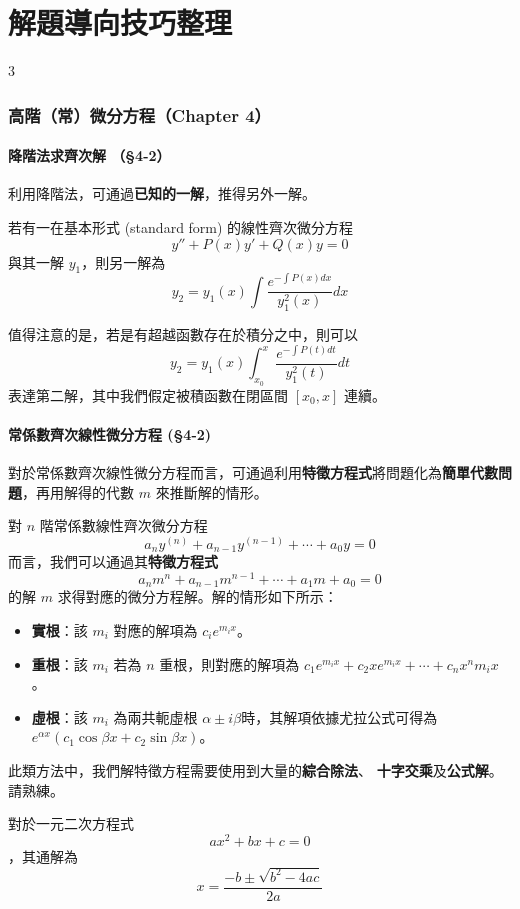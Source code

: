 \documentclass[UTF8, a4paper, fontset=none]{ctexart}
\begin{document}

\part{解題導向技巧整理}

\begin{multicols}{3}

\section{高階（常）微分方程（Chapter 4）} 	

\subsection{降階法求齊次解 （§4-2）}

利用降階法，可通過\textbf{已知的一解}，推得另外一解。

\begin{tcolorbox}[size=small, title={\textbf{降階法}（已知一齊次解，待求另一解。）}]
若有一在基本形式 (standard form) 的線性齊次微分方程
$$
y''+P(x)y'+Q(x)y=0
$$
與其一解 $y_1$，則另一解為
$$
y_2 = y_1(x) \int {\frac{e^{-\int{P(x)dx}}}{y_1^2(x)} dx}
$$
\end{tcolorbox}

值得注意的是，若是有超越函數存在於積分之中，則可以
$$
y_2 = y_1(x) \int_{x_0}^{x} {\frac{e^{-\int{P(t)dt}}}{y_1^2(t)} dt}
$$
表達第二解，其中我們假定被積函數在閉區間 $[x_0, x]$ 連續。

\subsection{常係數齊次線性微分方程 (§4-2)}
對於常係數齊次線性微分方程而言，可通過利用\textbf{特徵方程式}將問題化為\textbf{簡單代數問題}，再用解得的代數 $m$ 來推斷解的情形。
\begin{tcolorbox}[size=small, title={\textbf{特徵方程式} (auxiliary equation) }]
對 $n$ 階常係數線性齊次微分方程
$$
a_ny^{(n)}+a_{n-1}y^{(n-1)}+\cdots+a_0y=0
$$
而言，我們可以通過其\textbf{特徵方程式}
$$
a_nm^n+a_{n-1}m^{n-1}+\cdots+a_1m+a_0=0
$$
的解 $m$ 求得對應的微分方程解。解的情形如下所示：
\begin{itemize}
\item \textbf{實根}：該 $m_i$ 對應的解項為 $c_ie^{m_ix}$。
\item \textbf{重根}：該 $m_i$ 若為 $n$ 重根，則對應的解項為 $c_1e^{m_ix}+c_2xe^{m_ix}+\cdots+c_nx^n{m_ix}$。
\item \textbf{虛根}：該 $m_i$ 為兩共軛虛根 $\alpha\pm i\beta$時，其解項依據尤拉公式可得為 $e^{\alpha x} (c_1 \cos{\beta x}+c_2 \sin{\beta x})$。
\end{itemize}
\end{tcolorbox}
此類方法中，我們解特徵方程需要使用到大量的\textbf{綜合除法}、 \textbf{十字交乘}及\textbf{公式解}。請熟練。
\begin{tcolorbox}[size=small, title={一元二次方程的\textbf{公式解}}]
對於一元二次方程式
$$
ax^2+bx+c=0
$$
，其通解為
$$
x=\frac{-b\pm\sqrt{b^2-4ac}}{2a}
$$
\end{tcolorbox}



\end{multicols}
\end{document}
